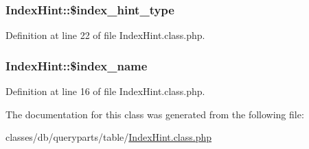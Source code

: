 \subsubsection[{\$index\+\_\+hint\+\_\+type}]{\setlength{\rightskip}{0pt plus 5cm}Index\+Hint\+::\$index\+\_\+hint\+\_\+type}\label{classIndexHint_a04d23166dfd4b7490a69b678e2826a32}


Definition at line 22 of file Index\+Hint.\+class.\+php.

\hypertarget{classIndexHint_a72e2ec1c8ae97c974642bf4342febc60}{}
\subsubsection[{\$index\+\_\+name}]{\setlength{\rightskip}{0pt plus 5cm}Index\+Hint\+::\$index\+\_\+name}\label{classIndexHint_a72e2ec1c8ae97c974642bf4342febc60}


Definition at line 16 of file Index\+Hint.\+class.\+php.



The documentation for this class was generated from the following file\+:\begin{DoxyCompactItemize}
\item 
classes/db/queryparts/table/\hyperlink{IndexHint_8class_8php}{Index\+Hint.\+class.\+php}\end{DoxyCompactItemize}
